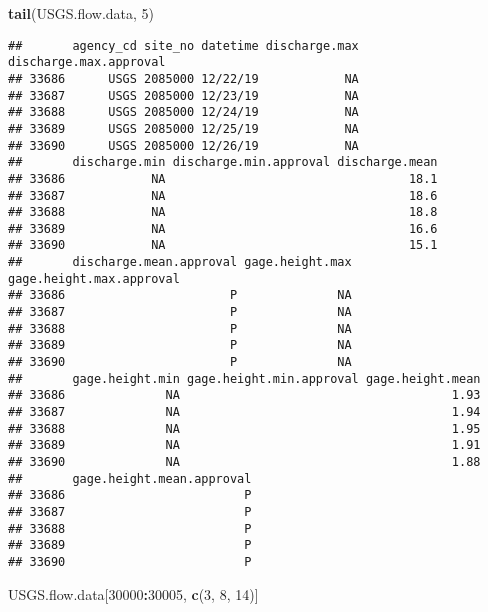 \documentclass[]{article}
\newenvironment{Shaded}{\begin{snugshade}}{\end{snugshade}}
\newcommand{\DecValTok}[1]{\textcolor[rgb]{0.00,0.00,0.81}{#1}}
\newcommand{\KeywordTok}[1]{\textcolor[rgb]{0.13,0.29,0.53}{\textbf{#1}}}
\newcommand{\NormalTok}[1]{#1}
\newcommand{\OperatorTok}[1]{\textcolor[rgb]{0.81,0.36,0.00}{\textbf{#1}}}
\begin{document}
\begin{Shaded}
\begin{Highlighting}[]
\KeywordTok{tail}\NormalTok{(USGS.flow.data, }\DecValTok{5}\NormalTok{)}
\end{Highlighting}
\end{Shaded}

\begin{verbatim}
##       agency_cd site_no datetime discharge.max discharge.max.approval
## 33686      USGS 2085000 12/22/19            NA                       
## 33687      USGS 2085000 12/23/19            NA                       
## 33688      USGS 2085000 12/24/19            NA                       
## 33689      USGS 2085000 12/25/19            NA                       
## 33690      USGS 2085000 12/26/19            NA                       
##       discharge.min discharge.min.approval discharge.mean
## 33686            NA                                  18.1
## 33687            NA                                  18.6
## 33688            NA                                  18.8
## 33689            NA                                  16.6
## 33690            NA                                  15.1
##       discharge.mean.approval gage.height.max gage.height.max.approval
## 33686                       P              NA                         
## 33687                       P              NA                         
## 33688                       P              NA                         
## 33689                       P              NA                         
## 33690                       P              NA                         
##       gage.height.min gage.height.min.approval gage.height.mean
## 33686              NA                                      1.93
## 33687              NA                                      1.94
## 33688              NA                                      1.95
## 33689              NA                                      1.91
## 33690              NA                                      1.88
##       gage.height.mean.approval
## 33686                         P
## 33687                         P
## 33688                         P
## 33689                         P
## 33690                         P
\end{verbatim}

\begin{Shaded}
\begin{Highlighting}[]
\NormalTok{USGS.flow.data[}\DecValTok{30000}\OperatorTok{:}\DecValTok{30005}\NormalTok{, }\KeywordTok{c}\NormalTok{(}\DecValTok{3}\NormalTok{, }\DecValTok{8}\NormalTok{, }\DecValTok{14}\NormalTok{)]}
\end{Highlighting}
\end{Shaded}
\end{document}
